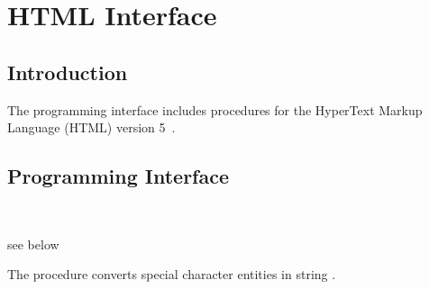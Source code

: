 %
%
%


\chapter {HTML Interface}\label{chap:http}

\section {Introduction}

The programming interface includes procedures for the HyperText Markup
Language (HTML) version 5~\cite{html5}.

\section {Programming Interface}

\begin{procedure}
   \\
  \strut
\end{procedure}
\returns{} see below

The  procedure converts special character entities
in string .

